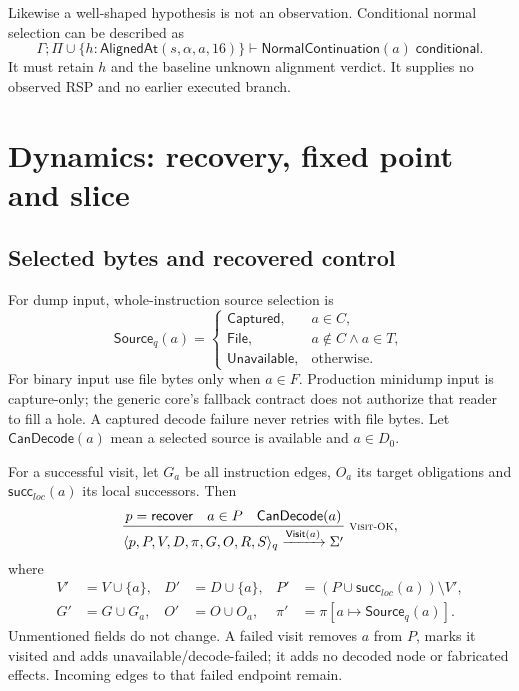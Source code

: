 \documentclass[11pt,a4paper]{article}
\newcommand{\ty}[1]{\mathsf{#1}}
\newcommand{\rulelabel}[1]{\text{\scriptsize\textsc{#1}}}
\begin{document}
Likewise a well-shaped hypothesis is not an observation. Conditional normal
selection can be described as
\[
 \Gamma;\Pi\cup\{h:\ty{AlignedAt}(s,\alpha,a,16)\}
 \vdash\ty{NormalContinuation}(a)\;\ty{conditional}.
\]
It must retain $h$ and the baseline unknown alignment verdict. It supplies no
observed RSP and no earlier executed branch.

\section{Dynamics: recovery, fixed point and slice}
\label{sec:dynamics}
\subsection{Selected bytes and recovered control}
For dump input, whole-instruction source selection is
\[
 \ty{Source}_q(a)=
 \begin{cases}
 \ty{Captured},&a\in C,\\
 \ty{File},&a\notin C\land a\in T,\\
 \ty{Unavailable},&\text{otherwise}.
 \end{cases}
\]
For binary input use file bytes only when $a\in F$. Production minidump input
is capture-only; the generic core's fallback contract does not authorize that
reader to fill a hole. A captured decode failure never retries with file bytes.
Let $\ty{CanDecode}(a)$ mean a selected source is available and $a\in D_0$.

For a successful visit, let $G_a$ be all instruction edges, $O_a$ its target
obligations and $\ty{succ}_{loc}(a)$ its local successors. Then
\[
\frac{p=\ty{recover}\quad a\in P\quad\ty{CanDecode}(a)}
 {\langle p,P,V,D,\pi,G,O,R,S\rangle_q
  \xrightarrow{\ty{Visit}(a)}\Sigma'}
 \;\rulelabel{Visit-OK},
\]
where
\begin{align*}
 V'&=V\cup\{a\},& D'&=D\cup\{a\},&
 P'&=(P\cup\ty{succ}_{loc}(a))\setminus V',\\
 G'&=G\cup G_a,& O'&=O\cup O_a,&
 \pi'&=\pi[a\mapsto\ty{Source}_q(a)].
\end{align*}
Unmentioned fields do not change. A failed visit removes $a$ from $P$, marks
it visited and adds unavailable/decode-failed; it adds no decoded node or
fabricated effects. Incoming edges to that failed endpoint remain.
\end{document}
